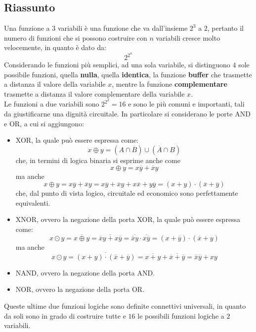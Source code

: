 \documentclass[a4paper]{extarticle}
\begin{document}
\subsection{Riassunto}
Una funzione a \(3\) variabili è una funzione che va dall'insieme \(2^3\) a \(2\), pertanto il numero di funzioni che si possono costruire con \(n\) variabili cresce molto velocemente, in quanto è dato da:
\[2^{2^n}\]
Considerando le funzioni più semplici, ad una sola variabile, si distinguono \(4\) sole possibile funzioni, quella \textbf{nulla}, quella \textbf{identica}, la funzione \textbf{buffer} che trasmette a distanza il valore della variabile \(x\), mentre la funzione \textbf{complementare} trasmette a distanza il valore complementare della variabile \(x\).\\
Le funzioni a due variabili sono \(2^{2^2} = 16\) e sono le più comuni e importanti, tali da giustificarne una dignità circuitale. In particolare si considerano le porte AND e OR, a cui si aggiungono:
\begin{itemize}
    \item XOR, la quale può essere espressa come:
    \[x \oplus y = (A \cap \overline{B}) \cup (\overline{A} \cap B)\]
    che, in termini di logica binaria si esprime anche come
    \[x \oplus y = x\overline{y} + \overline{x}y \]
    ma anche
    \[x \oplus y = x\overline{y} + \overline{x}y = x\overline{y} + \overline{x}y + x\overline{x} + y \overline{y} = (x + y) \cdot (\overline{x} + \overline{y})\]
    che, dal punto di vista logico, circuitale ed economico sono perfettamente equivalenti.

    \item XNOR, ovvero la negazione della porta XOR, la quale può essere espressa come:
    \[x \odot y = \overline{x \oplus y} = \overline{\overline{x}y + x \overline{y}} = \overline{\overline{x}y} \cdot \overline{x\overline{y}} = (x + \overline{y}) \cdot (\overline{x} + y)\]
    ma anche
    \[x \odot y = \overline{(x + y) \cdot (\overline{x} + \overline{y})} = \overline{x + y} + \overline{\overline{x} + \overline{y}} = \overline{x} \overline{y} + xy\]

    \item NAND, ovvero la negazione della porta AND.

    \item NOR, ovvero la negazione della porta OR.
\end{itemize}

\noindent
Queste ultime due funzioni logiche sono definite connettivi universali, in quanto da soli sono in grado di costruire tutte e \(16\) le possibili funzioni logiche a \(2\) variabili.
\end{document}
